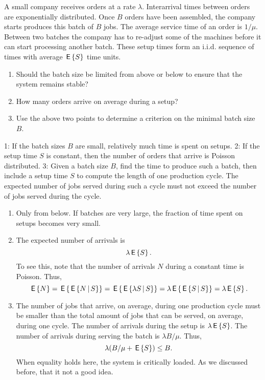 \begin{exercise} 

  A small company receives orders at a rate $\lambda$.  Interarrival
  times between orders are exponentially distributed. Once $B$ orders
  have been assembled, the company starts produces this batch of $B$
  jobs.  The average service time of an order is $1/\mu$. Between two
  batches the company has to re-adjust some of the machines before it
  can start processing another batch. These setup times form an
  i.i.d. sequence of times with average $\,\mathsf{E}\left\{S\right\}$ time units.

\begin{enumerate}
\item Should the batch size be limited from above or below to ensure that the system remains stable? 
\item How many orders arrive on average during a setup?
\item Use the above two points to determine a criterion on the minimal
  batch size $B$.
\end{enumerate}
\begin{hint}
1: If the batch sizes $B$ are small, relatively much time is
  spent on setups. 2: If the setup time $S$ is constant, then the
  number of orders that arrive is Poisson distributed. 3: Given a
  batch size $B$, find the time to produce such a batch, then include
  a setup time $S$ to compute the length of one production cycle. The
  expected number of jobs served during such a cycle must not exceed the number of jobs served during the cycle.
\end{hint}
\begin{solution}
\begin{enumerate}
\item Only from below. If batches are very large, the fraction of time spent on setups becomes very small.
\item The expected number of arrivals is 
\begin{equation*}
    \lambda \,\mathsf{E}\left\{S\right\}.
  \end{equation*}
To see this, note that  the number of arrivals $N$ during a constant time is Poisson. Thus,
\begin{equation*}
  \,\mathsf{E}\left\{N\right\} = \,\mathsf{E}\left\{ \,\mathsf{E}\left\{N\,\middle|\, S\right\}\right\} = \,\mathsf{E}\left\{ \,\mathsf{E}\left\{\lambda S\,\middle|\, S\right\}\right\} = \lambda \,\mathsf{E}\left\{\,\mathsf{E}\left\{S \,\middle|\, S\right\}\right\} = \lambda \,\mathsf{E}\left\{S\right\}.
\end{equation*}

\item  The number of jobs that arrive, on average, during one
  production cycle must be smaller than the total amount of jobs that
  can be served, on average, during one cycle.   The number of arrivals during the setup is $\lambda \,\mathsf{E}\left\{S\right\}$. The number of arrivals during serving the batch is $\lambda B/\mu$. Thus, 
  \begin{equation*}
    \lambda ( B/\mu + \,\mathsf{E}\left\{S\right\}) \leq B.
  \end{equation*}
  When equality holds here, the system is critically loaded. As we
  discussed before, that it not a good idea.
\end{enumerate}
\end{solution}
\end{exercise}

